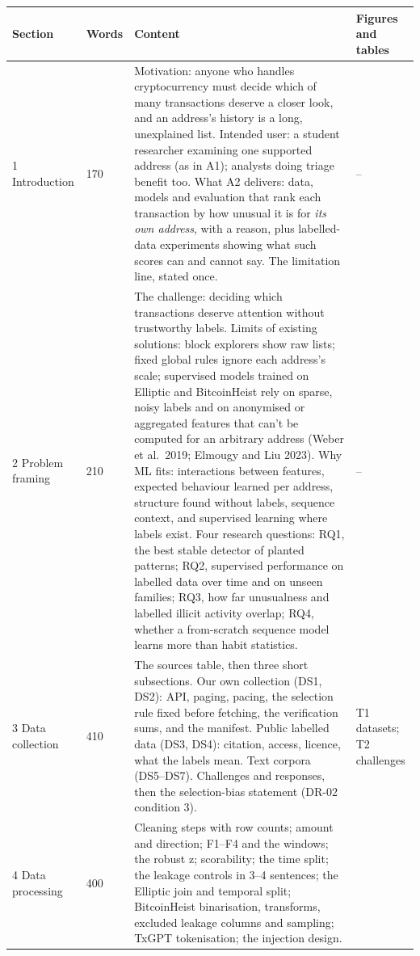 \begin{longtable}{@{}L{2.6cm}C{1.25cm}L{7.15cm}L{3.2cm}@{}}
\toprule
\textbf{Section} & \textbf{Words} & \textbf{Content} & \textbf{Figures and tables} \\
\midrule
{} Introduction & 170 &
Motivation: anyone who handles cryptocurrency must decide which of many transactions deserve a
closer look, and an address's history is a long, unexplained list. Intended user: a student
researcher examining one supported address (as in A1); analysts doing triage benefit too. What A2
delivers: data, models and evaluation that rank each transaction by how unusual it is for
\emph{its own address}, with a reason, plus labelled-data experiments showing what such scores
can and cannot say. The limitation line, stated once. &
-- \\
2 Problem framing & 210 &
The challenge: deciding which transactions deserve attention without trustworthy labels.
Limits of existing solutions: block explorers show raw lists; fixed global rules ignore each
address's scale; supervised models trained on Elliptic and BitcoinHeist rely on sparse, noisy
labels and on anonymised or aggregated features that can't be computed for an arbitrary address
(Weber et al.\ 2019; Elmougy and Liu 2023). Why ML fits: interactions between features,
expected behaviour learned per address, structure found without labels, sequence context, and
supervised learning where labels exist. Four research questions: RQ1, the best stable detector
of planted patterns; RQ2, supervised performance on labelled data over time and on unseen
families; RQ3, how far unusualness and labelled illicit activity overlap; RQ4, whether a
from-scratch sequence model learns more than habit statistics. &
-- \\
3 Data collection & 410 &
The sources table, then three short subsections. Our own collection (DS1, DS2): API, paging,
pacing, the selection rule fixed before fetching, the verification sums, and the manifest.
Public labelled data (DS3, DS4): citation, access, licence, what the labels mean. Text corpora
(DS5--DS7). Challenges and responses, then the selection-bias statement (DR-02 condition 3). &
T1 datasets; T2 challenges \\
4 Data processing & 400 &
Cleaning steps with row counts; amount and direction; F1--F4 and the windows; the robust z;
scorability; the time split; the leakage controls in 3--4 sentences; the Elliptic join and
temporal split; BitcoinHeist binarisation, transforms, excluded leakage columns and sampling;
TxGPT tokenisation; the injection design. &

\end{longtable}
